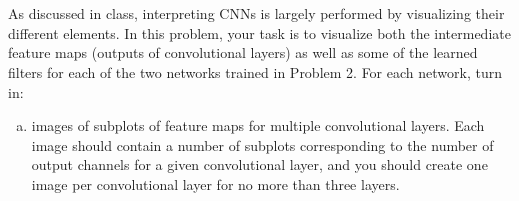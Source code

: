 \documentclass{article}[12pt]
\begin{document}
\clearpage
\section{}

As discussed in class, interpreting CNNs is largely performed by visualizing their different elements. In this problem, your task is to visualize both the intermediate feature maps (outputs of convolutional layers) as well as some of the learned filters for each of the two networks trained in Problem 2. For each network, turn in:
\begin{enumerate}[(a)]
    \item images of subplots of feature maps for multiple convolutional layers. Each image should contain a number of subplots corresponding to the number of output channels for a given convolutional layer, and you should create one image per convolutional layer for no more than three layers.


\end{enumerate}
\end{document}
